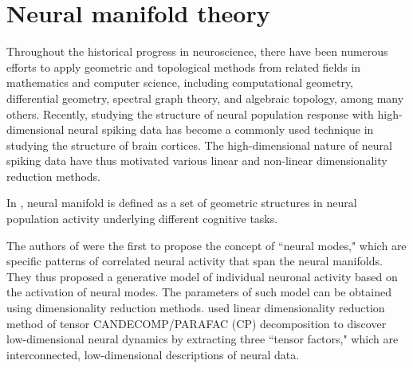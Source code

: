 \section{Neural manifold theory}
Throughout the historical progress in neuroscience, there have been numerous efforts to apply geometric and topological methods from related fields in mathematics and computer science, including computational geometry, differential geometry, spectral graph theory, and algebraic topology, among many others. Recently, studying the structure of neural population response with high-dimensional neural spiking data has become a commonly used technique in studying the structure of brain cortices. The high-dimensional nature of neural spiking data have thus motivated various linear and non-linear dimensionality reduction methods. 

In \cite{chung_neural_2021}, neural manifold is defined as a set of geometric structures in neural population activity underlying different cognitive tasks. 

The authors of \cite{gallego_neural_2017} were the first to propose the concept of ``neural modes," which are specific patterns of correlated neural activity that span the neural manifolds. They thus proposed a generative model of individual neuronal activity based on the activation of neural modes. The parameters of such model can be obtained using dimensionality reduction methods. \cite{williams_unsupervised_2018} used linear dimensionality reduction method of tensor CANDECOMP/PARAFAC (CP) decomposition to discover low-dimensional neural dynamics by extracting three ``tensor factors," which are interconnected, low-dimensional descriptions of neural data.

